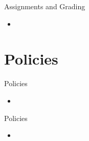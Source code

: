 \documentclass{beamer}
\begin{document}
\begin{frame}{Assignments and Grading}
    \begin{itemize}
        \item
    \end{itemize}
\end{frame}

\section{Policies}
\begin{frame}{Policies}
    \begin{itemize}
        \item
    \end{itemize}
\end{frame}

\begin{frame}{Policies}
    \begin{itemize}
        \item
    \end{itemize}
\end{frame}




\end{document}
